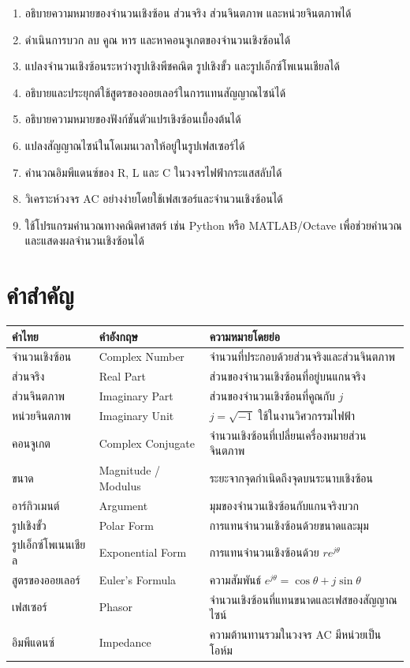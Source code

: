 \begin{enumerate}
\item อธิบายความหมายของจำนวนเชิงซ้อน ส่วนจริง ส่วนจินตภาพ และหน่วยจินตภาพได้
\item ดำเนินการบวก ลบ คูณ หาร และหาคอนจูเกตของจำนวนเชิงซ้อนได้
\item แปลงจำนวนเชิงซ้อนระหว่างรูปเชิงพีชคณิต รูปเชิงขั้ว และรูปเอ็กซ์โพเนนเชียลได้
\item อธิบายและประยุกต์ใช้สูตรของออยเลอร์ในการแทนสัญญาณไซน์ได้
\item อธิบายความหมายของฟังก์ชันตัวแปรเชิงซ้อนเบื้องต้นได้
\item แปลงสัญญาณไซน์ในโดเมนเวลาให้อยู่ในรูปเฟสเซอร์ได้
\item คำนวณอิมพีแดนซ์ของ R, L และ C ในวงจรไฟฟ้ากระแสสลับได้
\item วิเคราะห์วงจร AC อย่างง่ายโดยใช้เฟสเซอร์และจำนวนเชิงซ้อนได้
\item ใช้โปรแกรมคำนวณทางคณิตศาสตร์ เช่น Python หรือ MATLAB/Octave เพื่อช่วยคำนวณและแสดงผลจำนวนเชิงซ้อนได้
\end{enumerate}

\section{คำสำคัญ}

\begin{longtable}{L{0.24\textwidth}L{0.28\textwidth}L{0.38\textwidth}}
\toprule
\textbf{คำไทย} & \textbf{คำอังกฤษ} & \textbf{ความหมายโดยย่อ} \\
\midrule
จำนวนเชิงซ้อน & Complex Number & จำนวนที่ประกอบด้วยส่วนจริงและส่วนจินตภาพ \\
ส่วนจริง & Real Part & ส่วนของจำนวนเชิงซ้อนที่อยู่บนแกนจริง \\
ส่วนจินตภาพ & Imaginary Part & ส่วนของจำนวนเชิงซ้อนที่คูณกับ $j$ \\
หน่วยจินตภาพ & Imaginary Unit & $j=\sqrt{-1}$ ใช้ในงานวิศวกรรมไฟฟ้า \\
คอนจูเกต & Complex Conjugate & จำนวนเชิงซ้อนที่เปลี่ยนเครื่องหมายส่วนจินตภาพ \\
ขนาด & Magnitude / Modulus & ระยะจากจุดกำเนิดถึงจุดบนระนาบเชิงซ้อน \\
อาร์กิวเมนต์ & Argument & มุมของจำนวนเชิงซ้อนกับแกนจริงบวก \\
รูปเชิงขั้ว & Polar Form & การแทนจำนวนเชิงซ้อนด้วยขนาดและมุม \\
รูปเอ็กซ์โพเนนเชียล & Exponential Form & การแทนจำนวนเชิงซ้อนด้วย $re^{j\theta}$ \\
สูตรของออยเลอร์ & Euler’s Formula & ความสัมพันธ์ $e^{j\theta}=\cos\theta+j\sin\theta$ \\
เฟสเซอร์ & Phasor & จำนวนเชิงซ้อนที่แทนขนาดและเฟสของสัญญาณไซน์ \\
อิมพีแดนซ์ & Impedance & ความต้านทานรวมในวงจร AC มีหน่วยเป็นโอห์ม \\
\bottomrule
\end{longtable}

